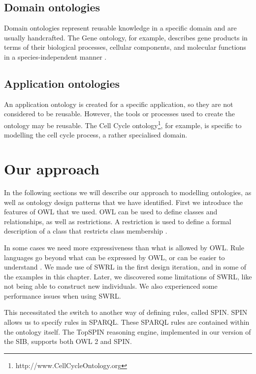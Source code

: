 \subsection{Domain ontologies}
Domain ontologies represent reusable knowledge in a specific domain and are usually handcrafted. The Gene ontology, for example, describes gene products in terms of their biological processes, cellular components, and molecular functions in a species-independent manner \cite{Jepsen2009}. 

\subsection{Application ontologies} 
An application ontology is created for a specific application, so they are not considered to be reusable. However, the tools or processes used to create the ontology may be reusable. The Cell Cycle ontology\footnote{http://www.CellCycleOntology.org}, for example, is specific to modelling the cell cycle process, a rather specialised domain.


\section{Our approach}

In the following sections we will describe our approach to modelling ontologies, as well as ontology design patterns that we have identified. First we introduce the features of \ac{OWL} that we used. \ac{OWL} can be used to define classes and relationships, as well as restrictions. A restriction is used to define a formal description of a class that restricts class membership \cite{Allemang2011}. 

In some cases we need more expressiveness than what is allowed by \ac{OWL}. Rule languages go beyond what can be expressed by \ac{OWL}, or can be easier to understand \cite{Hebeler2009}. We made use of \ac{SWRL} in the first design iteration, and in some of the examples in this chapter. Later, we discovered some limitations of \ac{SWRL}, like not being able to construct new individuals. We also experienced some performance issues when using \ac{SWRL}.

This necessitated the switch to another way of defining rules, called \ac{SPIN}. \ac{SPIN} allows us to specify rules in \ac{SPARQL}. These \ac{SPARQL} rules are contained within the ontology itself. The TopSPIN reasoning engine, implemented in our version of the \ac{SIB}, supports both \ac{OWL} 2 and \ac{SPIN}.



